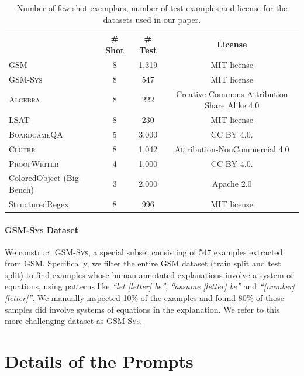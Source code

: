 \documentclass{article}
\theoremstyle{definition}
\newcommand{\gsm}{\textsc{GSM}}
\newcommand{\gsmsys}{\textsc{GSM-Sys}}
\newcommand{\algebra}{\textsc{Algebra}}
\newcommand{\lsat}{\textsc{LSAT}}
\newcommand{\clutrr}{\textsc{Clutrr}}
\newcommand{\proofwriter}{\textsc{ProofWriter}}
\newcommand{\boardgame}{\textsc{BoardgameQA}}
\begin{document}
\begin{table}[h]
    \caption{Number of few-shot exemplars, number of test examples and license for the datasets used in our paper.}
    \centering
    \scriptsize
    \begin{tabular}{lccc}
    \toprule
        & \bf \# Shot &\bf \# Test & \bf License \\
        \cmidrule{2-4} 
 \gsm{}~\citep{gsm8k}   & 8 & 1,319 & MIT license\\
\gsmsys{} & 8 & 547 &  MIT license \\
\algebra{}~\citep{gsmsat} & 8 & 222 & Creative Commons Attribution Share Alike 4.0 \\
        \cmidrule{2-4} 
\lsat{}~\citep{arlsat} & 8 & 230 & MIT license\\
\boardgame{}~\citep{boardgameqa} & 5 & 3,000 & CC BY 4.0. \\
\clutrr{}~\citep{clutrr} & 8 & 1,042 & Attribution-NonCommercial 4.0\\
\proofwriter{}~\citep{proofwriter} & 4 & 1,000 & CC BY 4.0. \\
        \cmidrule{2-4} 
    \sc ColoredObject (Big-Bench) & 3 & 2,000 & Apache 2.0\\
    \cmidrule{2-4}
    {\sc StructuredRegex}~\citep{structuredregex} & 8 & 996 & MIT license\\
    \bottomrule
    \end{tabular}
    \label{tab:dataset_stats}
\end{table}


\paragraph{\gsmsys{} Dataset}

We construct \gsmsys{}, a special subset consisting of 547 examples extracted from \gsm{}. Specifically, we filter the entire \gsm{} dataset (train split and test split) to find examples whose human-annotated explanations involve a system of equations, using patterns like \textit{``let [letter] be''}, \textit{``assume [letter] be''} and \textit{``{[number][letter]}''}. We manually inspected 10\% of the examples and found 80\% of those samples did involve systems of equations in the explanation. We refer to this more challenging dataset as \gsmsys{}.

\section{Details of the Prompts}
\label{app:detailed_baselines}
\end{document}
